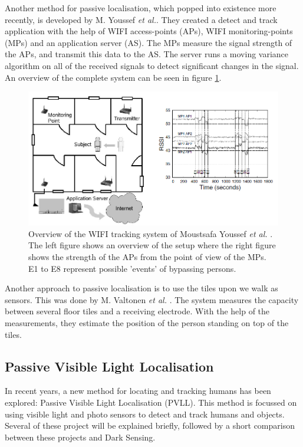 Another method for passive localisation, which popped into existence more recently, is developed by M. Youssef \textit{et al.}\cite{WIFI_Tracking}. They created a detect and track application with the help of WIFI access-points (APs), WIFI monitoring-points (MPs) and an application server (AS). The MPs measure the signal strength of the APs, and transmit this data to the AS. The server runs a moving variance algorithm on all of the received signals to detect significant changes in the signal. An overview of the complete system can be seen in figure \ref{fig:WIFI-tracking}.
\begin{figure}[]
	\centering
	\includegraphics[width=\textwidth]{pics/MovingVarriance1.png}
	\caption{Overview of the WIFI tracking system of Moustsafa Youssef \textit{et al.} \cite{WIFI_Tracking}. The left figure shows an overview of the setup where the right figure shows the strength of the APs from the point of view of the MPs. E1 to E8 represent possible 'events' of bypassing persons.\label{fig:WIFI-tracking}}
\end{figure}

Another approach to passive localisation is to use the tiles upon we walk as sensors. This was done by M. Valtonen \textit{et al.} \cite{Tile_Track}. The system measures the capacity between several floor tiles and a receiving electrode. With the help of the measurements, they estimate the position of the person standing on top of the tiles.

\subsection{Passive Visible Light Localisation}
In recent years, a new method for locating and tracking humans has been explored: Passive Visible Light Localisation (PVLL). This method is focussed on using visible light and photo sensors to detect and track humans and objects. Several of these project will be explained briefly, followed by a short comparison between these projects and Dark Sensing.

